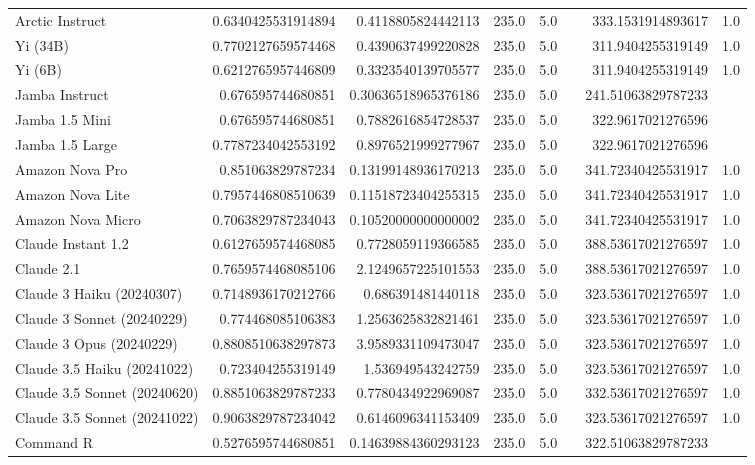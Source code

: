 \begin{table}[htp]
{\begin{tabular}{lrrrrrrr}
Arctic Instruct & 0.6340425531914894 & 0.4118805824442113 & 235.0 & 5.0 &  & 333.1531914893617 & 1.0 \\
Yi (34B) & 0.7702127659574468 & 0.4390637499220828 & 235.0 & 5.0 &  & 311.9404255319149 & 1.0 \\
Yi (6B) & 0.6212765957446809 & 0.3323540139705577 & 235.0 & 5.0 &  & 311.9404255319149 & 1.0 \\
Jamba Instruct & 0.676595744680851 & 0.30636518965376186 & 235.0 & 5.0 &  & 241.51063829787233 &  \\
Jamba 1.5 Mini & 0.676595744680851 & 0.7882616854728537 & 235.0 & 5.0 &  & 322.9617021276596 &  \\
Jamba 1.5 Large & 0.7787234042553192 & 0.8976521999277967 & 235.0 & 5.0 &  & 322.9617021276596 &  \\
Amazon Nova Pro & 0.851063829787234 & 0.13199148936170213 & 235.0 & 5.0 &  & 341.72340425531917 & 1.0 \\
Amazon Nova Lite & 0.7957446808510639 & 0.11518723404255315 & 235.0 & 5.0 &  & 341.72340425531917 & 1.0 \\
Amazon Nova Micro & 0.7063829787234043 & 0.10520000000000002 & 235.0 & 5.0 &  & 341.72340425531917 & 1.0 \\
Claude Instant 1.2 & 0.6127659574468085 & 0.7728059119366585 & 235.0 & 5.0 &  & 388.53617021276597 & 1.0 \\
Claude 2.1 & 0.7659574468085106 & 2.1249657225101553 & 235.0 & 5.0 &  & 388.53617021276597 & 1.0 \\
Claude 3 Haiku (20240307) & 0.7148936170212766 & 0.686391481440118 & 235.0 & 5.0 &  & 323.53617021276597 & 1.0 \\
Claude 3 Sonnet (20240229) & 0.774468085106383 & 1.2563625832821461 & 235.0 & 5.0 &  & 323.53617021276597 & 1.0 \\
Claude 3 Opus (20240229) & 0.8808510638297873 & 3.9589331109473047 & 235.0 & 5.0 &  & 323.53617021276597 & 1.0 \\
Claude 3.5 Haiku (20241022) & 0.723404255319149 & 1.536949543242759 & 235.0 & 5.0 &  & 323.53617021276597 & 1.0 \\
Claude 3.5 Sonnet (20240620) & 0.8851063829787233 & 0.7780434922969087 & 235.0 & 5.0 &  & 332.53617021276597 & 1.0 \\
Claude 3.5 Sonnet (20241022) & 0.9063829787234042 & 0.6146096341153409 & 235.0 & 5.0 &  & 323.53617021276597 & 1.0 \\
Command R & 0.5276595744680851 & 0.14639884360293123 & 235.0 & 5.0 &  & 322.51063829787233 &  \\

\end{tabular}}
\end{table}
